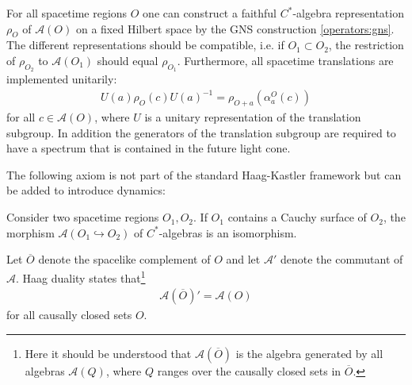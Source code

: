     \begin{axiom}[Spectrum]
        For all spacetime regions $O$ one can construct a faithful $C^*$-algebra representation $\rho_O$ of $\mathcal{A}(O)$ on a fixed Hilbert space by the GNS construction \ref{operators:gns}. The different representations should be compatible, i.e. if $O_1\subset O_2$, the restriction of $\rho_{O_2}$ to $\mathcal{A}(O_1)$ should equal $\rho_{O_1}$. Furthermore, all spacetime translations are implemented unitarily:
        \begin{gather}
            U(a)\rho_O(c)U(a)^{-1} = \rho_{O+a}(\alpha^O_a(c))
        \end{gather}
        for all $c\in\mathcal{A}(O)$, where $U$ is a unitary representation of the translation subgroup. In addition the generators of the translation subgroup are required to have a spectrum that is contained in the future light cone.
    \end{axiom}

    The following axiom is not part of the standard Haag-Kastler framework but can be added to introduce dynamics:
    \begin{axiom}
        Consider two spacetime regions $O_1,O_2$. If $O_1$ contains a Cauchy surface of $O_2$, the morphism $\mathcal{A}(O_1\hookrightarrow O_2)$ of $C^*$-algebras is an isomorphism.
    \end{axiom}

    \begin{axiom}
        Let $\overline{O}$ denote the spacelike complement of $O$ and let $\mathcal{A}'$ denote the commutant of $\mathcal{A}$. Haag duality states that\footnote{Here it should be understood that $\mathcal{A}\left(\overline{O}\right)$ is the algebra generated by all algebras $\mathcal{A}(Q)$, where $Q$ ranges over the causally closed sets in $\overline{O}$.}
        \begin{gather}
            \mathcal{A}\left(\overline{O}\right)' = \mathcal{A}(O)
        \end{gather}
        for all causally closed sets $O$.
    \end{axiom}

